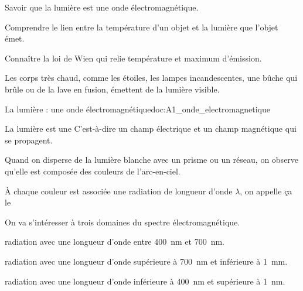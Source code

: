 \tetePremStssLumi
{}


\begin{objectifs}
  \item Savoir que la lumière est une onde électromagnétique.
  \item Comprendre le lien entre la température d'un objet et la lumière que l'objet émet.
  \item Connaître la loi de Wien qui relie température et maximum d'émission.
\end{objectifs}

\begin{contexte}
  Les corps très chaud, comme les étoiles, les lampes incandescentes, une bûche qui brûle ou de la lave en fusion, émettent de la lumière visible.
  
\end{contexte}


\begin{doc}{La lumière : une onde électromagnétique}{doc:A1_onde_electromagnetique}
  \begin{importants}
    La lumière est une 
    C'est-à-dire un champ électrique et un champ magnétique qui se propagent.
  \end{importants}

  Quand on disperse de la lumière blanche avec un prisme ou un réseau, on observe qu'elle est composée des couleurs de l'arc-en-ciel.
  \begin{center}
  \end{center}
  \begin{center}
  \end{center}

  À chaque couleur est associée une radiation de longueur d'onde $\lambda$, on appelle ça le 

  \begin{importants}    
    On va s'intéresser à trois domaines du spectre électromagnétique.
    \begin{listePoints}
      \item {} radiation avec une longueur d'onde entre \qty{400}{\nm} et \qty{700}{\nm}.
      \item {} radiation avec une longueur d'onde supérieure à \qty{700}{\nm} et inférieure à \qty{1}{\mm}.
      \item {} radiation avec une longueur d'onde inférieure à \qty{400}{\nm} et supérieure à \qty{1}{\nm}.
    \end{listePoints}
  \end{importants}
\end{doc}

